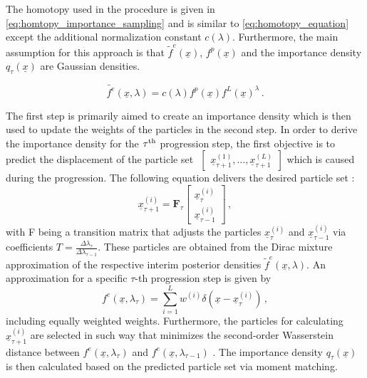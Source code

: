 \documentclass[a4paper]{IEEEtran}
\begin{document}
The homotopy used in the procedure \cite{chlebek2016a} is given in \eqref{eq:homtopy_importance_sampling} and is similar to \eqref{eq:homotopy_equation} except the additional normalization constant $c(\lambda)$.
Furthermore, the main assumption for this approach is that $\tilde{f}^{e}(\underline{x})$, $f^{p}(\underline{x})$ and the importance density $q_{\tau}(\underline{x})$ are Gaussian densities.

\begin{equation}
    \tilde{f^e}(\underline{x},\lambda) = c(\lambda)f^p(\underline{x})f^L(\underline{x})^{\lambda} \,.
    \label{eq:homtopy_importance_sampling}
\end{equation}

The first step is primarily aimed to create an importance density which is then used to update the weights of the particles in the second step.
In order to derive the importance density for the $\tau \textsuperscript{th}$ progression step, the first objective is to predict the displacement of the particle set $\,\, \begin{bmatrix} \underline{x}_{\tau+1}^{(1)}, \dotsc, \underline{x}_{\tau+1}^{(L)} \end{bmatrix}$ which is caused during the progression.
The following equation delivers the desired particle set \cite{chlebek2016a}:
\begin{equation}
    \underline{x}_{\tau + 1}^{(i)} = \textbf{F}_{\tau}
        \begin{bmatrix}
            \underline{x}_{\tau}^{(i)} \\ 
            \underline{x}_{\tau -1}^{(i)}
        \end{bmatrix} \,,
\end{equation}
with F being a transition matrix that adjusts the particles $\underline{x}_{\tau}^{(i)}$ and $\underline{x}_{\tau-1}^{(i)}$ via coefficients $T = \frac{\Delta\lambda_{\tau}}{\Delta\lambda_{\tau-1}}$\cite{chlebek2016a}.
These particles are obtained from the Dirac mixture approximation of the respective interim posterior densities $\tilde{f}^{e}(\underline{x}, \lambda)$.
An approximation for a specific $\tau$-th progression step is given by
 \begin{equation}
    f^{e}(\underline{x}, \lambda_{\tau}) = \sum_{i=1}^{L}w^{(i)}\delta(\underline{x}-\underline{x}_{\tau}^{(i)}) \,,
    \label{eq:dirac_approx_interim_posterior}
 \end{equation}
including equally weighted weights.
Furthermore, the particles for calculating $\underline{x}_{\tau + 1}^{(i)}$ are selected in such way that minimizes the second-order Wasserstein distance between  $f^{e}(\underline{x}, \lambda_{\tau})$ and $f^{e}(\underline{x}, \lambda_{\tau-1})$ \cite{chlebek2016a}. 
The importance density $q_{\tau}(\underline{x})$ is then calculated based on the predicted particle set via moment matching.
\end{document}
